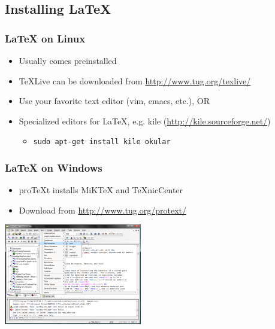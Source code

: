 \documentclass[utf8x]{beamer}
\begin{document}
  \subsection{Installing \LaTeX}
    \begin{frame}
      \frametitle{\LaTeX{} on Linux}
      \begin{itemize}
        \item Usually comes preinstalled
        \item \TeX Live can be downloaded from \url{http://www.tug.org/texlive/}
        \item Use your favorite text editor (vim, emacs, etc.), OR
        \item Specialized editors for \LaTeX, e.g. kile (\url{http://kile.sourceforge.net/})
          \begin{itemize}
            \item \texttt{sudo apt-get install kile okular}
          \end{itemize}
      \end{itemize}
    \end{frame}
    \begin{frame}
      \frametitle{\LaTeX{} on Windows}
      \begin{itemize}
        \item pro\TeX t installs MiK\TeX{} and \TeX nicCenter
        \item Download from \url{http://www.tug.org/protext/}
      \end{itemize}
      \begin{center}
        \includegraphics[width=0.45\textwidth]{TeXnicCenter1_gui}%
      \end{center}
    \end{frame}
\end{document}
